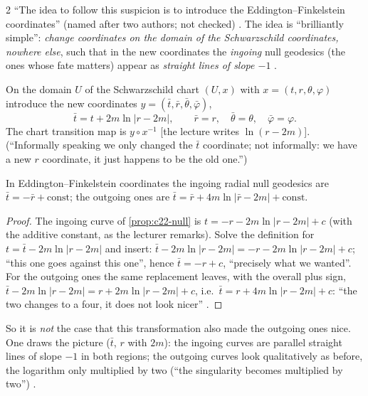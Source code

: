 \begin{paracol}{2}
``The idea to follow this suspicion is to introduce the Eddington--Finkelstein coordinates'' (named after two authors; not checked) . The idea is ``brilliantly simple'': \emph{change coordinates on the domain of the Schwarzschild coordinates, nowhere else}, such that in the new coordinates the \emph{ingoing} null geodesics (the ones whose fate matters) appear as \emph{straight lines of slope $-1$} .

\begin{definition}\label{def:c22-ef}
On the domain $U$ of the Schwarzschild chart $(U,x)$ with $x=(t,r,\theta,\varphi)$ introduce the new coordinates $y=(\bar t,\bar r,\bar\theta,\bar\varphi)$,
\[
  \bar t=t+2m\ln|r-2m|,\qquad\bar r=r,\quad\bar\theta=\theta,\quad\bar\varphi=\varphi .
\]
The chart transition map is $y\circ x^{-1}$ [the lecture writes $\ln(r-2m)$]. (``Informally speaking we only changed the $\bar t$ coordinate; not informally: we have a new $r$ coordinate, it just happens to be the old one.'')
\end{definition}

\begin{proposition}\label{prop:c22-straight}
In Eddington--Finkelstein coordinates the ingoing radial null geodesics are $\bar t=-\bar r+\text{const}$; the outgoing ones are $\bar t=\bar r+4m\ln|\bar r-2m|+\text{const}$.
\end{proposition}
\begin{proof}
The ingoing curve of \cref{prop:c22-null} is $t=-r-2m\ln|r-2m|+c$ (with the additive constant, as the lecturer remarks). Solve the definition for $t=\bar t-2m\ln|r-2m|$ and insert: $\bar t-2m\ln|r-2m|=-r-2m\ln|r-2m|+c$; ``this one goes against this one'', hence $\bar t=-r+c$, ``precisely what we wanted''. For the outgoing ones the same replacement leaves, with the overall plus sign, $\bar t-2m\ln|r-2m|=r+2m\ln|r-2m|+c$, i.e.\ $\bar t=r+4m\ln|r-2m|+c$: ``the two changes to a four, it does not look nicer'' .
\end{proof}
So it is \emph{not} the case that this transformation also made the outgoing ones nice. One draws the picture ($\bar t$, $r$ with $2m$): the ingoing curves are parallel straight lines of slope $-1$ in both regions; the outgoing curves look qualitatively as before, the logarithm only multiplied by two (``the singularity becomes multiplied by two'') .


\end{paracol}
